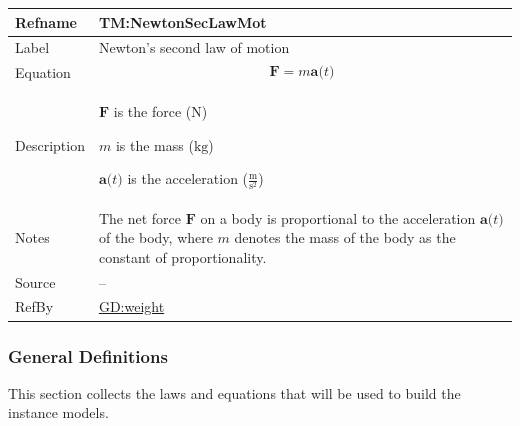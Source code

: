 \documentclass[12pt]{article}
\begin{document}
\medskip
\noindent
\begin{minipage}{\textwidth}
\begin{tabular}{>{\raggedright}p{}>{\raggedright\arraybackslash}p{}}
\toprule \textbf{Refname} & \textbf{TM:NewtonSecLawMot}
\label{TM:NewtonSecLawMot}
\\ \midrule
Label & Newton's second law of motion
        
\\ \midrule
Equation & \begin{displaymath}
           \symbf{F}=m \symbf{a}\text{(}t\text{)}
           \end{displaymath}
\\ \midrule
Description & \begin{symbDescription}
              \item{$\symbf{F}$ is the force (${\text{N}}$)}
              \item{$m$ is the mass (${\text{kg}}$)}
              \item{$\symbf{a}\text{(}t\text{)}$ is the acceleration ($\frac{\text{m}}{\text{s}^{2}}$)}
              \end{symbDescription}
\\ \midrule
Notes & The net force $\symbf{F}$ on a body is proportional to the acceleration $\symbf{a}\text{(}t\text{)}$ of the body, where $m$ denotes the mass of the body as the constant of proportionality.
        
\\ \midrule
Source & --
         
\\ \midrule
RefBy & \hyperref[GD:weight]{GD:weight}
        
\\ \bottomrule
\end{tabular}
\end{minipage}

\subsubsection{General Definitions}
\label{Sec:GDs}
This section collects the laws and equations that will be used to build the instance models.
\end{document}
